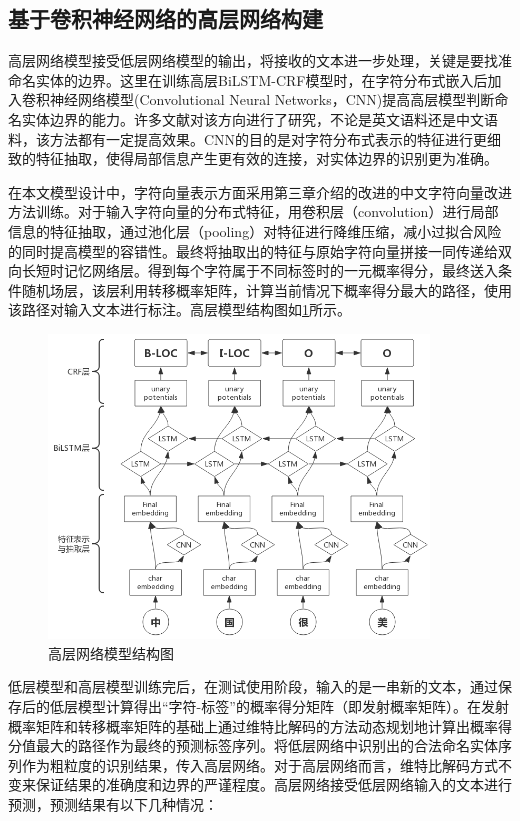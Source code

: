 \documentclass[winfonts,master,oneside,nobackinfo]{njuthesis}
\begin{document}
\subsection{基于卷积神经网络的高层网络构建}

高层网络模型接受低层网络模型的输出，将接收的文本进一步处理，关键是要找准命名实体的边界。这里在训练高层BiLSTM-CRF模型时，在字符分布式嵌入后加入卷积神经网络模型(Convolutional Neural Networks，CNN)提高高层模型判断命名实体边界的能力。许多文献对该方向进行了研究\cite{Ma,kang}，不论是英文语料\cite{Zenan}还是中文语料\cite{Yaozong}，该方法都有一定提高效果。CNN的目的是对字符分布式表示的特征进行更细致的特征抽取，使得局部信息产生更有效的连接，对实体边界的识别更为准确。

在本文模型设计中，字符向量表示方面采用第三章介绍的改进的中文字符向量改进方法训练。对于输入字符向量的分布式特征，用卷积层（convolution）进行局部信息的特征抽取，通过池化层（pooling）对特征进行降维压缩，减小过拟合风险的同时提高模型的容错性。最终将抽取出的特征与原始字符向量拼接一同传递给双向长短时记忆网络层。得到每个字符属于不同标签时的一元概率得分，最终送入条件随机场层，该层利用转移概率矩阵，计算当前情况下概率得分最大的路径，使用该路径对输入文本进行标注。高层模型结构图如\ref{high-level}所示。

\begin{figure}[h]
\centering
\includegraphics[width=0.9\textwidth]{./figure/CNN辅助.jpg}
\caption{高层网络模型结构图}
\label{high-level}
\end{figure}

低层模型和高层模型训练完后，在测试使用阶段，输入的是一串新的文本，通过保存后的低层模型计算得出“字符-标签”的概率得分矩阵（即发射概率矩阵）。在发射概率矩阵和转移概率矩阵的基础上通过维特比解码的方法动态规划地计算出概率得分值最大的路径作为最终的预测标签序列。将低层网络中识别出的合法命名实体序列作为粗粒度的识别结果，传入高层网络。对于高层网络而言，维特比解码方式不变来保证结果的准确度和边界的严谨程度。高层网络接受低层网络输入的文本进行预测，预测结果有以下几种情况：
\end{document}
